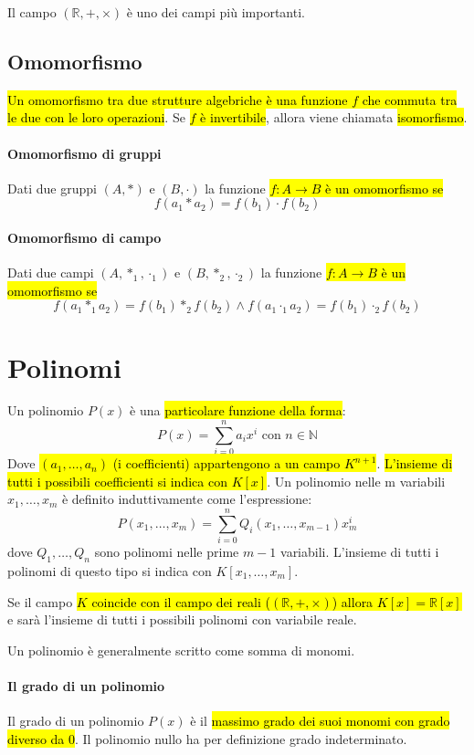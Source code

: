 \documentclass[a4paper,12pt,oneside]{article}
\begin{document}
Il campo $(\mathbb{R}, +, \times)$ è uno dei campi più importanti.

\subsection{Omomorfismo}
\hl{Un omomorfismo tra due strutture algebriche è una funzione $f$ che commuta
tra le due con le loro operazioni}. Se \hl{$f$ è invertibile}, allora viene
chiamata \hl{isomorfismo}.

\paragraph{Omomorfismo di gruppi} Dati due gruppi $(A, \ast)$ e $(B, \cdot)$ la
funzione \hl{$f: A \to B$ è un omomorfismo se}
\[
    f(a_1 \ast a_2) = f(b_1) \cdot f(b_2)
\]

\paragraph{Omomorfismo di campo} Dati due campi $(A, \ast_1, \cdot_1)$ e
$(B, \ast_2, \cdot_2)$ la funzione \hl{$f: A \to B$ è un omomorfismo se}
\[
    f(a_1 \ast_1 a_2) = f(b_1) \ast_2 f(b_2) \wedge
        f(a_1 \cdot_1 a_2) = f(b_1) \cdot_2 f(b_2)
\]

\section{Polinomi}
Un polinomio $P(x)$ è una \hl{particolare funzione della forma}:
\[
    P(x) = \sum_{i=0}^{n} a_i x^i \text{ con } n \in \mathbb{N}
\]
Dove \hl{$(a_1, \ldots, a_n)$ (i coefficienti) appartengono a un campo $K^{n+1}$}.
\hl{L'insieme di tutti i possibili coefficienti si indica con $K[x]$}.
Un polinomio nelle m variabili $x_1, \dots ,x_m$ è definito induttivamente come
l’espressione:
\[
    P(x_1, \ldots, x_m) = \sum_{i=0}^n Q_i(x_1, \ldots, x_{m-1})x_m^i
\]
dove $Q_1, \ldots, Q_n$ sono polinomi nelle prime $m - 1$ variabili. L’insieme
di tutti i polinomi di questo tipo si indica con $K[x_1, \ldots, x_m]$.

Se il campo \hl{$K$ coincide con il campo dei reali ($(\mathbb{R}, +, \times)$)
allora $K[x] = \mathbb{R}[x]$} e sarà l'insieme di tutti i possibili polinomi
con variabile reale.

Un polinomio è generalmente scritto come somma di monomi.

\paragraph{Il grado di un polinomio} Il grado di un polinomio $P(x)$ è il
\hl{massimo grado dei suoi monomi con grado diverso da 0}. Il polinomio nullo
ha per definizione grado indeterminato.
\end{document}
